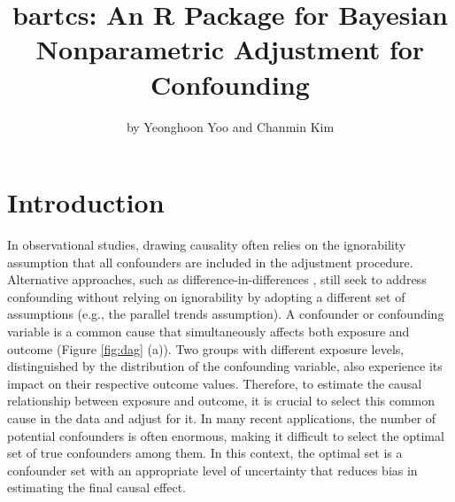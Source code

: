 \title{bartcs: An R Package for Bayesian Nonparametric Adjustment for Confounding}
\author{by Yeonghoon Yoo and Chanmin Kim}

\maketitle


\section{Introduction}


In observational studies, drawing causality often relies on the ignorability assumption \citep{rosenbaum_central_1983} that all confounders are included in the adjustment procedure. Alternative approaches, such as difference-in-differences \citep{abadie2005semiparametric}, still seek to address confounding without relying on ignorability by adopting a different set of assumptions (e.g., the parallel trends assumption). A confounder or confounding variable is a common cause that simultaneously affects both exposure and outcome (Figure \ref{fig:dag} (a)). Two groups with different exposure levels, distinguished by the distribution of the confounding variable, also experience its impact on their respective outcome values. Therefore, to estimate the causal relationship between exposure and outcome, it is crucial to select this common cause in the data and adjust for it. In many recent applications, the number of potential confounders is often enormous, making it difficult to select the optimal set of true confounders among them. In this context, the optimal set is a confounder set with an appropriate level of uncertainty that reduces bias in estimating the final causal effect.

